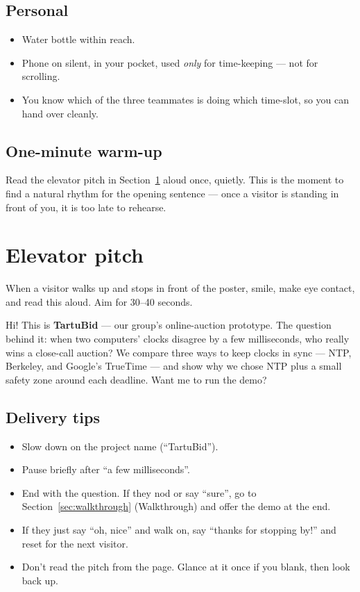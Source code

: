 \documentclass[a4paper,11pt]{article}
\begin{document}
\subsection*{Personal}
\begin{itemize}[leftmargin=*,nosep]
  \item Water bottle within reach.
  \item Phone on silent, in your pocket, used \emph{only} for
        time-keeping --- not for scrolling.
  \item You know which of the three teammates is doing which
        time-slot, so you can hand over cleanly.
\end{itemize}

\subsection*{One-minute warm-up}
Read the elevator pitch in Section~\ref{sec:pitch} aloud once,
quietly. This is the moment to find a natural rhythm for the
opening sentence --- once a visitor is standing in front of you,
it is too late to rehearse.

\newpage

\section{Elevator pitch}\label{sec:pitch}

When a visitor walks up and stops in front of the poster, smile,
make eye contact, and read this aloud. Aim for 30--40 seconds.

\begin{spoken}
Hi! This is \textbf{TartuBid} --- our group's online-auction
prototype. The question behind it: when two computers' clocks
disagree by a few milliseconds, who really wins a close-call
auction? We compare three ways to keep clocks in sync --- NTP,
Berkeley, and Google's TrueTime --- and show why we chose NTP
plus a small safety zone around each deadline. Want me to run
the demo?
\end{spoken}

\subsection*{Delivery tips}
\begin{itemize}[leftmargin=*,nosep]
  \item Slow down on the project name (``TartuBid'').
  \item Pause briefly after ``a few milliseconds''.
  \item End with the question. If they nod or say ``sure'', go to
        Section~\ref{sec:walkthrough} (Walkthrough) and offer the
        demo at the end.
  \item If they just say ``oh, nice'' and walk on, say ``thanks
        for stopping by!'' and reset for the next visitor.
  \item Don't read the pitch from the page. Glance at it once if
        you blank, then look back up.
\end{itemize}
\end{document}
